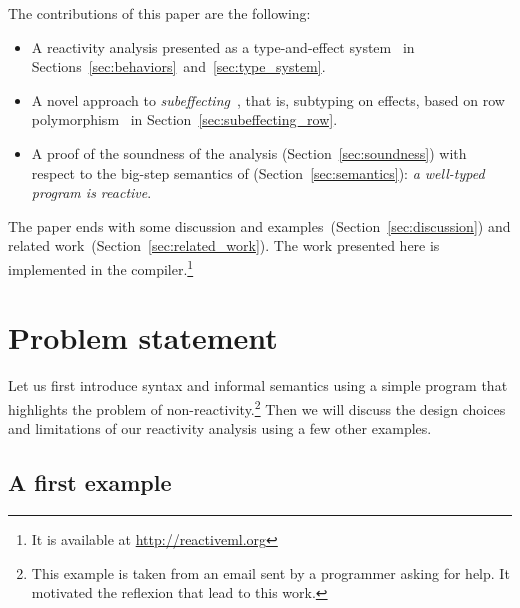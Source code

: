 \documentclass[9pt,preprint]{sigplanconf}
\begin{document}

The contributions of this paper are the following:
\begin{itemize}
\item A reactivity analysis presented as a type-and-effect system~\cite{Lucassen:1988} in Sections~\ref{sec:behaviors}~and~\ref{sec:type_system}.
\item A novel approach to \emph{subeffecting}~\cite{Nielson:1999}, that is, subtyping on effects, based on row polymorphism~\cite{Remy:1993} in Section~\ref{sec:subeffecting_row}.
\item A proof of the soundness of the analysis (Section~\ref{sec:soundness}) with respect to the big-step semantics of \rml (Section~\ref{sec:semantics}): \emph{a well-typed program is reactive}.
\end{itemize}

The paper ends with some discussion and examples~(Section~\ref{sec:discussion}) and related work~(Section~\ref{sec:related_work}). The work presented here is implemented in the \rml compiler.\footnote{It is available at \url{http://reactiveml.org}}

\clearpage

\section{Problem statement}
\label{sec:problem}

Let us first introduce \rml{} syntax and informal semantics using a simple program that highlights the problem of non-reactivity.\footnote{This example is taken from an email sent by a \rml programmer asking for help. It motivated the reflexion that lead to this work.} Then we will discuss the design choices and limitations of our reactivity analysis using a few other examples.

\subsection{A first example}
\label{sec:first_example}
\end{document}

